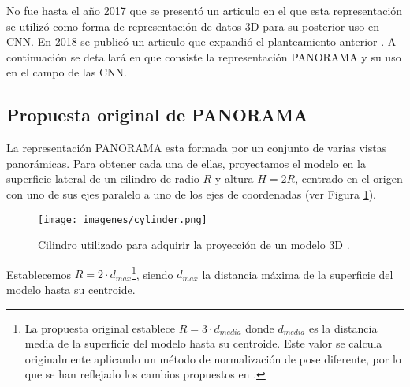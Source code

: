 No fue hasta el año 2017 que se presentó un articulo \cite{sfikas2017exploiting} en el que esta representación se utilizó como forma de representación de datos 3D para su posterior uso en CNN. En 2018 se publicó un articulo que expandió el planteamiento anterior \cite{SFIKAS2018208}. A continuación se detallará en que consiste la representación PANORAMA y su uso en el campo de las CNN.

\subsection{Propuesta original de PANORAMA}
\label{sec:panorama}

La representación PANORAMA esta formada por un conjunto de varias vistas panorámicas. Para obtener cada una de ellas, proyectamos el modelo en la superficie lateral de un cilindro de radio $R$ y altura $H = 2R$, centrado en el origen con uno de sus ejes paralelo a uno de los ejes de coordenadas (ver Figura \ref{fig:cilindro}).\\

\begin{figure}[ht]
    \centering
    \texttt{[image: imagenes/cylinder.png]}
    \caption[Cilindro utilizado para adquirir la proyección de un modelo 3D.]{Cilindro utilizado para adquirir la proyección de un modelo 3D \cite{papadakis2010panorama}.}
    \label{fig:cilindro}
\end{figure}

\newpage

Establecemos $R = 2 \cdot d_{max}$\footnote{La propuesta original establece $R = 3 \cdot d_{media}$ donde $d_{media}$ es la distancia media de la superficie del modelo hasta su centroide. Este valor se calcula originalmente aplicando un método de normalización de pose diferente, por lo que se han reflejado los cambios propuestos en \cite{sfikas2017exploiting}.}, siendo $d_{max}$ la distancia máxima de la superficie del modelo hasta su centroide.\\

